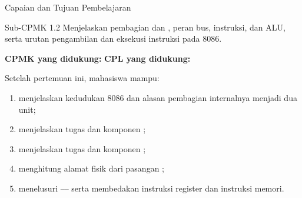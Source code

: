 \documentclass[aspectratio=169,11pt]{beamer}
\begin{document}

\begin{frame}{Capaian dan Tujuan Pembelajaran}
\begin{block}{Sub-CPMK 1.2}
\small Menjelaskan pembagian  dan
, peran bus,  instruksi, dan ALU,
serta urutan pengambilan dan eksekusi instruksi pada 8086.
\end{block}

\vspace{0.1em}
{\small\textbf{CPMK yang didukung:} \quad\textbullet\quad
\textbf{CPL yang didukung:} \par}

\vspace{0.15em}
\begin{exampleblock}{Setelah pertemuan ini, mahasiswa mampu:}
\footnotesize
\begin{enumerate}
    \item menjelaskan kedudukan 8086 dan alasan pembagian internalnya
          menjadi dua unit;
    \item menjelaskan tugas dan komponen ;
    \item menjelaskan tugas dan komponen ;
    \item menghitung alamat fisik dari pasangan
          ;
    \item menelusuri ---- serta
          membedakan instruksi register dan instruksi memori.
\end{enumerate}
\end{exampleblock}
\end{frame}
\end{document}
